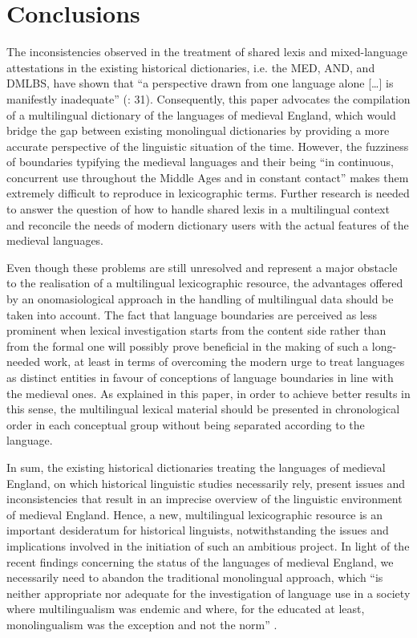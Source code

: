 \documentclass[output=paper,colorlinks,citecolor=brown,arabicfont,chinesefont]{langscibook}
\begin{document}
\section{Conclusions}

The inconsistencies observed in the treatment of shared lexis and mixed-language attestations in the existing historical dictionaries, i.e. the MED, AND, and DMLBS, have shown that “a perspective drawn from one language alone […] is manifestly inadequate” (\citealt{Trotter1996}:  31). Consequently, this paper advocates the compilation of a multilingual dictionary of the languages of medieval England, which would bridge the gap between existing monolingual dictionaries by providing a more accurate perspective of the linguistic situation of the time. However, the fuzziness of boundaries typifying the medieval languages and their being “in continuous, concurrent use throughout the Middle Ages and in constant contact” \citep[68]{Hunt2011} makes them extremely difficult to reproduce in lexicographic terms. Further research is needed to answer the question of how to handle shared lexis in a multilingual context and reconcile the needs of modern dictionary users with the actual features of the medieval languages.

Even though these problems are still unresolved and represent a major obstacle to the realisation of a multilingual lexicographic resource, the advantages offered by an onomasiological approach in the handling of multilingual data should be taken into account. The fact that language boundaries are perceived as less prominent when lexical investigation starts from the content side rather than from the formal one will possibly prove beneficial in the making of such a long-needed work, at least in terms of overcoming the modern urge to treat languages as distinct entities in favour of conceptions of language boundaries in line with the medieval ones. As explained in this paper, in order to achieve better results in this sense, the multilingual lexical material should be presented in chronological order in each conceptual group without being separated according to the language.

In sum, the existing historical dictionaries treating the languages of medieval England, on which historical linguistic studies necessarily rely, present issues and inconsistencies that result in an imprecise overview of the linguistic environment of medieval England. Hence, a new, multilingual lexicographic resource is an important desideratum for historical linguists, notwithstanding the issues and implications involved in the initiation of such an ambitious project. In light of the recent findings concerning the status of the languages of medieval England, we necessarily need to abandon the traditional monolingual approach, which “is neither appropriate nor adequate for the investigation of language use in a society where multilingualism was endemic and where, for the educated at least, monolingualism was the exception and not the norm” \citep[3]{Trotter2000a}.

{\sloppy\printbibliography[heading=subbibliography,notkeyword=this]}
\end{document}
